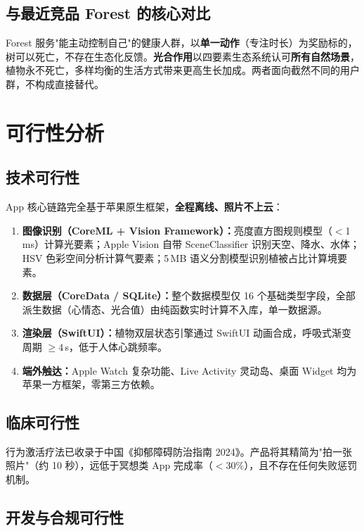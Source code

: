 \documentclass[11pt, a4paper]{article}
\newcommand{\kw}[1]{\textbf{#1}}
\begin{document}
\subsection*{与最近竞品 Forest 的核心对比}

Forest 服务"能主动控制自己"的健康人群，以\textbf{单一动作}（专注时长）为奖励标的，树可以死亡，不存在生态化反馈。\kw{光合作用}以四要素生态系统认可\textbf{所有自然场景}，植物永不死亡，多样均衡的生活方式带来更高生长加成。两者面向截然不同的用户群，不构成直接替代。


\section{可行性分析}

\subsection*{技术可行性}

App 核心链路完全基于苹果原生框架，\kw{全程离线、照片不上云}：

\begin{enumerate}
    \item \textbf{图像识别（CoreML + Vision Framework）：}亮度直方图规则模型（$<$1\,ms）计算光要素；Apple Vision 自带 SceneClassifier 识别天空、降水、水体；HSV 色彩空间分析计算气要素；5\,MB 语义分割模型识别植被占比计算境要素。
    \item \textbf{数据层（CoreData / SQLite）：}整个数据模型仅 16 个基础类型字段，全部派生数据（心情态、光合值）由纯函数实时计算不入库，单一数据源。
    \item \textbf{渲染层（SwiftUI）：}植物双层状态引擎通过 SwiftUI 动画合成，呼吸式渐变周期 $\geq 4$\,s，低于人体心跳频率。
    \item \textbf{端外触达：}Apple Watch 复杂功能、Live Activity 灵动岛、桌面 Widget 均为苹果一方框架，零第三方依赖。
\end{enumerate}

\subsection*{临床可行性}

行为激活疗法已收录于中国《抑郁障碍防治指南 2024》。产品将其精简为"拍一张照片"（约 10 秒），远低于冥想类 App 完成率（$<30\%$），且不存在任何失败惩罚机制。

\subsection*{开发与合规可行性}
\end{document}
